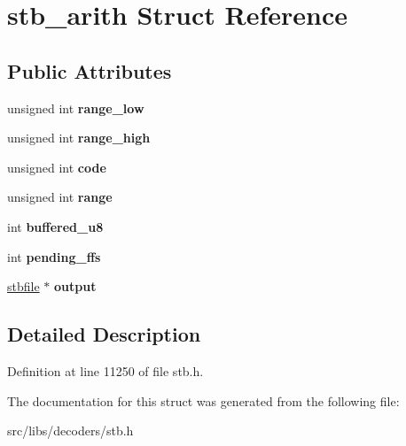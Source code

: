 \hypertarget{structstb__arith}{\section{stb\-\_\-arith Struct Reference}
\label{structstb__arith}
}
\subsection*{Public Attributes}
\begin{DoxyCompactItemize}
\item 
\hypertarget{structstb__arith_a05dcf4c05b5235b69395fb7daaf3b85c}{unsigned int {\bfseries range\-\_\-low}}\label{structstb__arith_a05dcf4c05b5235b69395fb7daaf3b85c}

\item 
\hypertarget{structstb__arith_ae58b37476f74b31dbb0c60d2d6d06b40}{unsigned int {\bfseries range\-\_\-high}}\label{structstb__arith_ae58b37476f74b31dbb0c60d2d6d06b40}

\item 
\hypertarget{structstb__arith_a65eb39d7caf85537dfceaa777367c2d3}{unsigned int {\bfseries code}}\label{structstb__arith_a65eb39d7caf85537dfceaa777367c2d3}

\item 
\hypertarget{structstb__arith_a10422ba40f3faab47f3edc470dc43163}{unsigned int {\bfseries range}}\label{structstb__arith_a10422ba40f3faab47f3edc470dc43163}

\item 
\hypertarget{structstb__arith_a2093b2b33bdf4b751f63d339fdf4a6db}{int {\bfseries buffered\-\_\-u8}}\label{structstb__arith_a2093b2b33bdf4b751f63d339fdf4a6db}

\item 
\hypertarget{structstb__arith_a974ec2b6824ce405ed93e5ee65c48e68}{int {\bfseries pending\-\_\-ffs}}\label{structstb__arith_a974ec2b6824ce405ed93e5ee65c48e68}

\item 
\hypertarget{structstb__arith_a6181c0a64c853bea73c6dec20399a573}{\hyperlink{structstbfile}{stbfile} $\ast$ {\bfseries output}}\label{structstb__arith_a6181c0a64c853bea73c6dec20399a573}

\end{DoxyCompactItemize}


\subsection{Detailed Description}


Definition at line 11250 of file stb.\-h.



The documentation for this struct was generated from the following file\-:\begin{DoxyCompactItemize}
\item 
src/libs/decoders/stb.\-h\end{DoxyCompactItemize}
